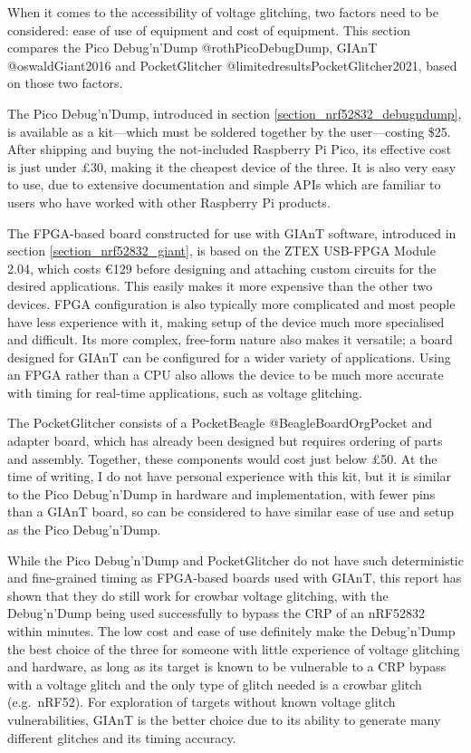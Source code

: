 When it comes to the accessibility of voltage glitching, two factors
need to be considered: ease of use of equipment and cost of equipment.
This section compares the Pico Debug'n'Dump @rothPicoDebugDump, GIAnT
@oswaldGiant2016 and PocketGlitcher @limitedresultsPocketGlitcher2021,
based on those two factors.

The Pico Debug'n'Dump, introduced in section
\ref{section_nrf52832_debugndump}, is available as a kit---which must be
soldered together by the user---costing \$25. After shipping and buying
the not-included Raspberry Pi Pico, its effective cost is just under
£30, making it the cheapest device of the three. It is also very easy to
use, due to extensive documentation and simple APIs which are familiar
to users who have worked with other Raspberry Pi products.

The FPGA-based board constructed for use with GIAnT software, introduced
in section \ref{section_nrf52832_giant}, is based on the ZTEX USB-FPGA
Module 2.04, which costs €129 before designing and attaching custom
circuits for the desired applications. This easily makes it more
expensive than the other two devices. FPGA configuration is also
typically more complicated and most people have less experience with it,
making setup of the device much more specialised and difficult. Its more
complex, free-form nature also makes it versatile; a board designed for
GIAnT can be configured for a wider variety of applications. Using an
FPGA rather than a CPU also allows the device to be much more accurate
with timing for real-time applications, such as voltage glitching.

The PocketGlitcher consists of a PocketBeagle @BeagleBoardOrgPocket and
adapter board, which has already been designed but requires ordering of
parts and assembly. Together, these components would cost just below
£50. At the time of writing, I do not have personal experience with this
kit, but it is similar to the Pico Debug'n'Dump in hardware and
implementation, with fewer pins than a GIAnT board, so can be considered
to have similar ease of use and setup as the Pico Debug'n'Dump.

While the Pico Debug'n'Dump and PocketGlitcher do not have such
deterministic and fine-grained timing as FPGA-based boards used with
GIAnT, this report has shown that they do still work for crowbar voltage
glitching, with the Debug'n'Dump being used successfully to bypass the
CRP of an nRF52832 within minutes. The low cost and ease of use
definitely make the Debug'n'Dump the best choice of the three for
someone with little experience of voltage glitching and hardware, as
long as its target is known to be vulnerable to a CRP bypass with a
voltage glitch and the only type of glitch needed is a crowbar glitch
(e.g.~nRF52). For exploration of targets without known voltage glitch
vulnerabilities, GIAnT is the better choice due to its ability to
generate many different glitches and its timing accuracy.


